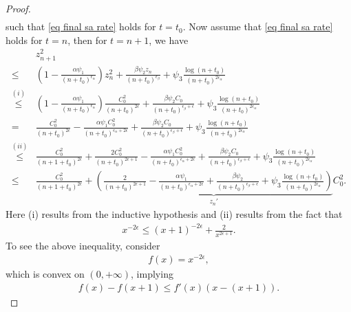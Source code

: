 \documentclass[twoside,11pt]{article}
\numberwithin{assucounter}{section}
\begin{document}
\begin{proof}
\begin{align}
\end{align}
such that 
\eqref{eq final sa rate} holds for $t=t_0$.
Now assume that \eqref{eq final sa rate} holds for $t=n$,
then for $t=n+1$,
we have
\begin{align}
  &z_{n+1}^2 \\
  \leq& (1-\frac{\alpha\psi_1}{(n+t_0)^{\epsilon_\alpha}})z_n^2 + \frac{\beta \psi_2 {z_n}}{(n+t_0)^{\epsilon_\beta}} +  \psi_3 \frac{\log (n+t_0)}{(n+t_0)^{2\epsilon_\alpha}} \\
  \stackrel{(i)}{\leq}& (1-\frac{\alpha\psi_1}{(n+t_0)^{\epsilon_\alpha}})\frac{C_0^2}{(n+t_0)^{2\epsilon}} + \frac{\beta \psi_2 C_0}{(n+t_0)^{\epsilon_\beta + \epsilon}} +  \psi_3 \frac{\log (n+t_0)}{(n+t_0)^{2\epsilon_\alpha}} \\
  =& \frac{C_0^2}{(n+t_0)^{2\epsilon}} - \frac{\alpha\psi_1C_0^2}{(n+t_0)^{\epsilon_\alpha+2\epsilon}} + \frac{\beta \psi_2 C_0}{(n+t_0)^{\epsilon_\beta + \epsilon}} +  \psi_3 \frac{\log (n+t_0)}{(n+t_0)^{2\epsilon_\alpha}} \\
  \stackrel{(ii)}{\leq}& \frac{C_0^2}{(n+1+t_0)^{2\epsilon}} + \frac{2C_0^2}{(n+t_0)^{2\epsilon + 1}} - \frac{\alpha\psi_1C_0^2}{(n+t_0)^{\epsilon_\alpha+2\epsilon}} + \frac{\beta \psi_2 C_0}{(n+t_0)^{\epsilon_\beta + \epsilon}} +  \psi_3 \frac{\log (n+t_0)}{(n+t_0)^{2\epsilon_\alpha}} \\
  \stackrel{}{\leq}& \frac{C_0^2}{(n+1+t_0)^{2\epsilon}} + \underbrace{\left(\frac{2}{(n+t_0)^{2\epsilon + 1}} - \frac{\alpha\psi_1}{(n+t_0)^{\epsilon_\alpha+2\epsilon}} + \frac{\beta \psi_2 }{(n+t_0)^{\epsilon_\beta + \epsilon}} +  \psi_3 \frac{\log (n+t_0)}{(n+t_0)^{2\epsilon_\alpha}}\right)}_{z_n'}C_0^2.
\end{align}
Here (i) results from the inductive hypothesis
and (ii) results from the fact that
\begin{align}
  x^{-2\epsilon} \leq (x+1)^{-2\epsilon} + \frac{2}{x^{2\epsilon+1}}.
\end{align}
To see the above inequality,
consider
\begin{align}
  f(x) = x^{-2\epsilon},
\end{align}
which is convex on $(0, +\infty)$,
implying
\begin{align}
  f(x) - f(x+1) \leq f'(x) \left(x - (x+1)\right).
\end{align}

\end{proof}
\end{document}
